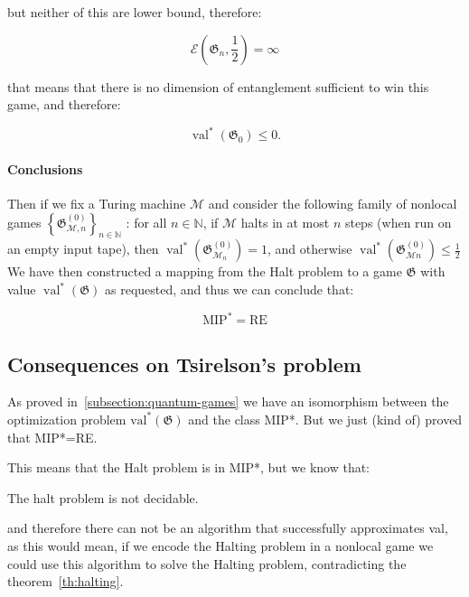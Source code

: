 but neither of this are lower bound, therefore:

\begin{equation}
    \mathscr{E}\left(\mathfrak{G}_{n}, \frac{1}{2}\right) = \infty
\end{equation}

that means that there is no dimension of entanglement sufficient to win this game, and therefore:

\begin{equation}
    \operatorname{val}^{*}(\mathfrak{G}_0) \leq 0.
\end{equation}
\paragraph{Conclusions}
Then if we fix a Turing machine $\mathcal{M}$ and consider the following family of nonlocal games $\left\{\mathfrak{G}_{\mathcal{M}, n}^{(0)}\right\}_{n \in \mathbb{N}}$ : for all $n \in \mathbb{N}$, if $\mathcal{M}$ halts in at most $n$ steps (when run on an empty input tape), then $\operatorname{val}^{*}\left(\mathfrak{G}_{\mathcal{M}_{n}}^{(0)}\right)=1$, and otherwise $\operatorname{val}^{*}\left(\mathfrak{G}_{\mathcal{M} n}^{(0)}\right) \leq \frac{1}{2}$
We have then constructed a mapping from the Halt problem to a game $\mathfrak{G}$ with value $\operatorname{val}^{*}(\mathfrak{G})$ as requested, and thus we can conclude that:
\begin{theorem}
\begin{equation}
\text{MIP}^{*} = \text{RE}
\end{equation}
\end{theorem}

\subsection{Consequences on Tsirelson's problem}
As proved in~\ref{subsection:quantum-games} we have an isomorphism between the optimization problem $\operatorname{val^{*}}(\mathfrak{G})$ and the class MIP*. But we just (kind of) proved that MIP*=RE.

This means that the Halt problem is in MIP*, but we know that:

\begin{theorem}\label{th:halting}
    The halt problem is not decidable.
\end{theorem}

and therefore there can not be an algorithm that successfully approximates val, as this would mean, if we encode the Halting problem in a nonlocal game we could use this algorithm to solve the Halting problem, contradicting the theorem~\ref{th:halting}.

